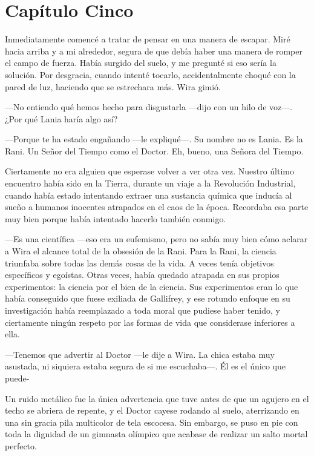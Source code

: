 \chapter*{Capítulo Cinco}

Inmediatamente comencé a tratar de pensar en una manera de escapar. Miré
hacia arriba y a mi alrededor, segura de que debía haber una manera de
romper el campo de fuerza. Había surgido del suelo, y me pregunté si eso
sería la solución. Por desgracia, cuando intenté tocarlo,
accidentalmente choqué con la pared de luz, haciendo que se estrechara
más. Wira gimió.

---No entiendo qué hemos hecho para disgustarla ---dijo con un hilo de
voz---. ¿Por qué Lania haría algo así?

---Porque te ha estado engañando ---le expliqué---. Su nombre no es
Lania. Es la Rani. Un Señor del Tiempo como el Doctor. Eh, bueno, una
Señora del Tiempo.

Ciertamente no era alguien que esperase volver a ver otra vez. Nuestro
último encuentro había sido en la Tierra, durante un viaje a la
Revolución Industrial, cuando había estado intentando extraer una
sustancia química que inducía al sueño a humanos inocentes atrapados en
el caos de la época. Recordaba esa parte muy bien porque había intentado
hacerlo también conmigo.

---Es una científica ---eso era un eufemismo, pero no sabía muy bien
cómo aclarar a Wira el alcance total de la obsesión de la Rani. Para la
Rani, la ciencia triunfaba sobre todas las demás cosas de la vida. A
veces tenía objetivos específicos y egoístas. Otras veces, había quedado
atrapada en sus propios experimentos: la ciencia por el bien de la
ciencia. Sus experimentos eran lo que había conseguido que fuese
exiliada de Gallifrey, y ese rotundo enfoque en su investigación había
reemplazado a toda moral que pudiese haber tenido, y ciertamente ningún
respeto por las formas de vida que considerase inferiores a ella.

---Tenemos que advertir al Doctor ---le dije a Wira. La chica estaba muy
asustada, ni siquiera estaba segura de si me escuchaba---. Él es el
único que puede-

Un ruido metálico fue la única advertencia que tuve antes de que un
agujero en el techo se abriera de repente, y el Doctor cayese rodando al
suelo, aterrizando en una sin gracia pila multicolor de tela escocesa.
Sin embargo, se puso en pie con toda la dignidad de un gimnasta olímpico
que acabase de realizar un salto mortal perfecto.

